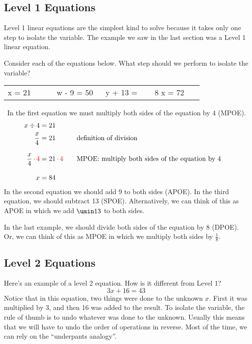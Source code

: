 \subsection{Level 1 Equations}

Level 1 linear equations are the simplest kind to solve because it takes only one step to isolate the variable. The example we saw in the last section was a Level 1 linear equation.

\begin{boxedex}
Consider each of the equations below. What step should we perform to isolate the variable?

\begin{tabular}{C{0.2\linewidth}C{0.2\linewidth}C{0.2\linewidth}C{0.2\linewidth}}
x = 21 & w - 9 = 50 & y + 13 =  & 8 x = 72\\
\end{tabular}

\expsoln\ In the first equation we must multiply both sides of the equation by 4 (MPOE).
\[\begin{aligned}
x \div 4& = 21\\
\frac{x}{4}& = 21
&&\text{\quad definition of division}\\[2ex]
\frac{x}{4} {\color{red} \,\cdot\,4} & = 21 {\color{red} \,\cdot\,4}
&&\text{\quad MPOE: multiply both sides of the equation by 4}\\[2ex]
x & = 84
\end{aligned}\]
In the second equation we should add 9 to both sides (APOE). In the third equation, we should subtract 13 (SPOE). Alternatively, we can think of this as APOE in which we add $\umin13$ to both sides.

In the last example, we should divide both sides of the equation by 8 (DPOE). Or, we can think of this as MPOE in which we multiply both sides by $\frac{1}{8}$.
\end{boxedex}

\subsection{Level 2 Equations}

Here's an example of a level 2 equation. How is it different from Level 1? \[3x + 16 = 43\]
Notice that in this equation, two things were done to the unknown $x$. First it was multiplied by 3, and then 16 was added to the result. To isolate the variable, the rule of thumb is to undo whatever was done to the unknown. Usually this means that we will have to undo the order of operations in reverse. Most of the time, we can rely on the ``underpants analogy''.


